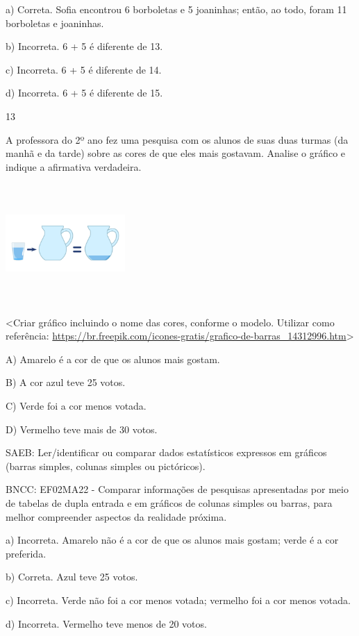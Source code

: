 \begin{escolha}
\begin{escolha}
{{{{a) Correta. Sofia encontrou 6 borboletas e 5 joaninhas; então, ao todo,
foram 11 borboletas e joaninhas.

b) Incorreta. 6 + 5 é diferente de 13.

c) Incorreta. 6 + 5 é diferente de 14.

d) Incorreta. 6 + 5 é diferente de 15.

\num{13}

A professora do 2º ano fez uma pesquisa com os alunos de suas duas
turmas (da manhã e da tarde) sobre as cores de que eles mais gostavam.
Analise o gráfico e indique a afirmativa verdadeira.

\includegraphics[width=1.78819in,height=1.78819in]{media/image140.png}

\textless{}Criar gráfico incluindo o nome das cores, conforme o modelo.
Utilizar como referência:
\url{https://br.freepik.com/icones-gratis/grafico-de-barras_14312996.htm}\textgreater{}

A) Amarelo é a cor de que os alunos mais gostam.

B) A cor azul teve 25 votos.

C) Verde foi a cor menos votada.

D) Vermelho teve mais de 30 votos.

SAEB: Ler/identificar ou comparar dados estatísticos expressos
em gráficos (barras simples, colunas simples ou pictóricos).

BNCC: EF02MA22 - Comparar informações de pesquisas apresentadas por meio
de tabelas de dupla entrada e em gráficos de colunas simples ou barras,
para melhor compreender aspectos da realidade próxima.

a) Incorreta. Amarelo não é a cor de que os alunos mais gostam; verde é a
cor preferida.

b) Correta. Azul teve 25 votos.

c) Incorreta. Verde não foi a cor menos votada; vermelho foi a cor menos votada.

d) Incorreta. Vermelho teve menos de 20 votos.

}}}}
\end{escolha}
\end{escolha}
